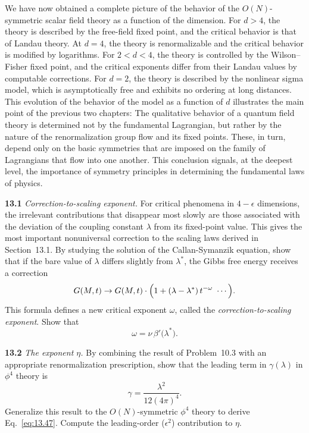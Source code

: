 We have now obtained a complete picture of the behavior of the
$O(N)$-symmetric scalar field theory as a function of the dimension.  For
$d > 4$, the theory is described by the free-field fixed point, and the
critical behavior is that of Landau theory.  At $d = 4$, the theory is
renormalizable and the critical behavior is modified by logarithms.  For
$2 < d < 4$, the theory is controlled by the Wilson--Fisher fixed point, and
the critical exponents differ from their Landau values by computable
corrections.  For $d = 2$, the theory is described by the nonlinear sigma
model, which is asymptotically free and exhibits no ordering at long
distances.  This evolution of the behavior of the model as a function of $d$
illustrates the main point of the previous two chapters: The qualitative
behavior of a quantum field theory is determined not by the fundamental
Lagrangian, but rather by the nature of the renormalization group flow and its
fixed points.  These, in turn, depend only on the basic symmetries that are
imposed on the family of Lagrangians that flow into one another.  This
conclusion signals, at the deepest level, the importance of symmetry
principles in determining the fundamental laws of physics.

\problems

\textbf{13.1} \emph{Correction-to-scaling exponent.}  For critical phenomena in
$4-\epsilon$ dimensions, the irrelevant contributions that disappear most
slowly are those associated with the deviation of the coupling constant
$\lambda$ from its fixed-point value.  This gives the most important
nonuniversal correction to the scaling laws derived in Section~13.1.  By
studying the solution of the Callan-Symanzik equation, show that if the bare
value of $\lambda$ differs slightly from $\lambda^{*}$, the Gibbs free energy
receives a correction
\begin{equation}
  G(M,t) \to G(M,t)\cdot\Bigl( 1 + (\lambda-\lambda^{*})\,
    t^{-\omega}\ \cdots \Bigr) .
\end{equation}
This formula defines a new critical exponent $\omega$, called the
\emph{correction-to-scaling exponent}.  Show that
\begin{equation}
  \omega = \nu\,\beta'\bigl( \lambda^{*} \bigr) .
\end{equation}

\textbf{13.2} \emph{The exponent $\eta$.}  By combining the result of
Problem~10.3 with an appropriate renormalization prescription, show that the
leading term in $\gamma(\lambda)$ in $\phi^4$ theory is
\begin{equation}
  \gamma = \frac{\lambda^2}{12(4\pi)^4} .
\end{equation}
Generalize this result to the $O(N)$-symmetric $\phi^4$ theory to derive
Eq.~\eqref{eq:13.47}.  Compute the leading-order ($\epsilon^2$) contribution
to $\eta$.

